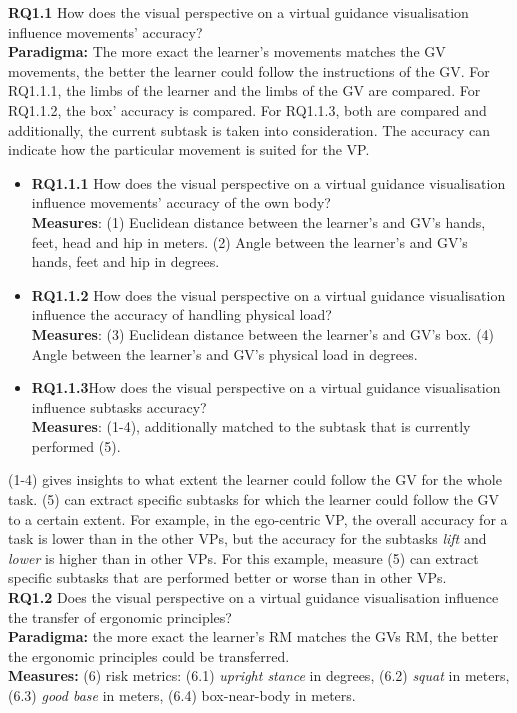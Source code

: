 \textbf{RQ1.1} How does the visual perspective on a virtual guidance visualisation influence movements' accuracy?\\
\textbf{Paradigma:} The more exact the learner's movements matches the GV movements, the better the learner could follow the instructions of the GV. For RQ1.1.1, the limbs of the learner and the limbs of the GV are compared. For RQ1.1.2, the box' accuracy is compared. For RQ1.1.3, both are compared and additionally, the current subtask is taken into consideration. The accuracy can indicate how the particular movement is suited for the VP.
\begin{itemize}
	\item[] \textbf{RQ1.1.1} How does the visual perspective on a virtual guidance visualisation influence movements' accuracy of the own body?\\
	\textbf{Measures}: (1) Euclidean distance between the learner's and GV's hands, feet, head and hip in meters. (2) Angle between the learner's and GV's hands, feet and hip in degrees.
	
	\item[] \textbf{RQ1.1.2} How does the visual perspective on a virtual guidance visualisation influence the accuracy of handling physical load?\\
	\textbf{Measures}: (3) Euclidean distance between the learner's and GV's box. (4) Angle between the learner's and GV's physical load in degrees.
	
	\item[] \textbf{RQ1.1.3}How does the visual perspective on a virtual guidance visualisation influence subtasks accuracy?\\
	\textbf{Measures}: (1-4), additionally matched to the subtask that is currently performed (5).
\end{itemize}	
(1-4) gives insights to what extent the learner could follow the GV for the whole task. (5) can extract specific subtasks for which the learner could follow the GV to a certain extent. For example, in the ego-centric VP, the overall accuracy for a task is lower than in the other VPs, but the accuracy for the subtasks \textit{lift} and \textit{lower} is higher than in other VPs. For this example, measure (5) can extract specific subtasks that are performed better or worse than in other VPs.\\

\textbf{RQ1.2} Does the visual perspective on a virtual guidance visualisation influence the transfer of ergonomic principles?\\
\textbf{Paradigma:} the more exact the learner's RM matches the GVs RM, the better the ergonomic principles could be transferred.\\
\textbf{Measures:} (6) risk metrics: (6.1) \textit{upright stance} in degrees, (6.2) \textit{squat} in meters, (6.3) \textit{good base} in meters, (6.4) box-near-body in meters.\\

